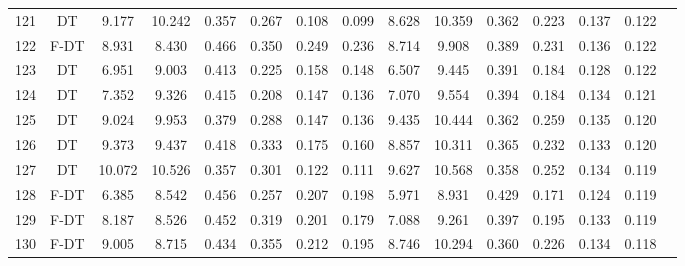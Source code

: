 \begin{longtable}{@{\hskip3pt}c@{\hskip3pt}c@{\hskip3pt}c@{\hskip3pt}c@{\hskip3pt}c@{\hskip3pt}c@{\hskip3pt}c@{\hskip3pt}c@{\hskip3pt}c@{\hskip3pt}c@{\hskip3pt}c@{\hskip3pt}c@{\hskip3pt}c@{\hskip3pt}c@{\hskip3pt}c}
        121 &             DT &             9.177 &      10.242 &         0.357 &       0.267 &       0.108 &        0.099 &               8.628 &      10.359 &         0.362 &       0.223 &       0.137 &        0.122 \\
        122 &           F-DT &             8.931 &       8.430 &         0.466 &       0.350 &       0.249 &        0.236 &               8.714 &       9.908 &         0.389 &       0.231 &       0.136 &        0.122 \\
        123 &             DT &             6.951 &       9.003 &         0.413 &       0.225 &       0.158 &        0.148 &               6.507 &       9.445 &         0.391 &       0.184 &       0.128 &        0.122 \\
        124 &             DT &             7.352 &       9.326 &         0.415 &       0.208 &       0.147 &        0.136 &               7.070 &       9.554 &         0.394 &       0.184 &       0.134 &        0.121 \\
        125 &             DT &             9.024 &       9.953 &         0.379 &       0.288 &       0.147 &        0.136 &               9.435 &      10.444 &         0.362 &       0.259 &       0.135 &        0.120 \\
        126 &             DT &             9.373 &       9.437 &         0.418 &       0.333 &       0.175 &        0.160 &               8.857 &      10.311 &         0.365 &       0.232 &       0.133 &        0.120 \\
        127 &             DT &            10.072 &      10.526 &         0.357 &       0.301 &       0.122 &        0.111 &               9.627 &      10.568 &         0.358 &       0.252 &       0.134 &        0.119 \\
        128 &           F-DT &             6.385 &       8.542 &         0.456 &       0.257 &       0.207 &        0.198 &               5.971 &       8.931 &         0.429 &       0.171 &       0.124 &        0.119 \\
        129 &           F-DT &             8.187 &       8.526 &         0.452 &       0.319 &       0.201 &        0.179 &               7.088 &       9.261 &         0.397 &       0.195 &       0.133 &        0.119 \\
        130 &           F-DT &             9.005 &       8.715 &         0.434 &       0.355 &       0.212 &        0.195 &               8.746 &      10.294 &         0.360 &       0.226 &       0.134 &        0.118 \\

\end{longtable}

